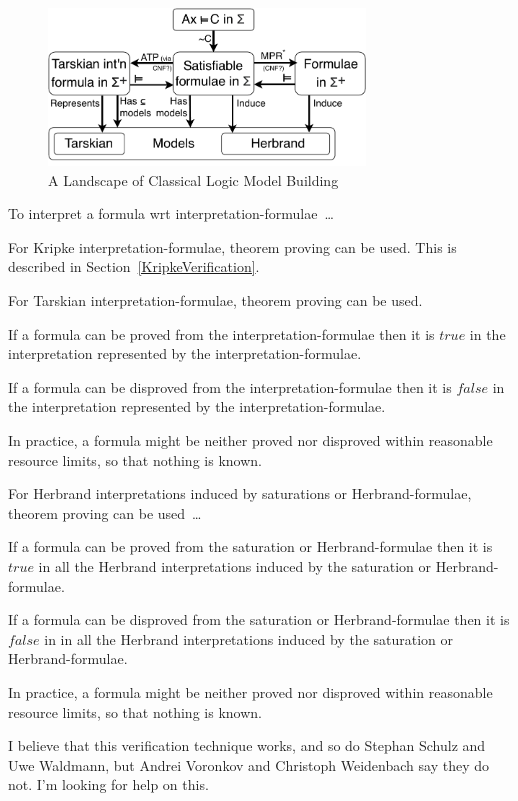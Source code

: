 \documentclass{easychair}
\newenvironment{packed_itemize}{
\vspace*{-0.3em}
\begin{itemize}
\setlength{\partopsep}{0pt}
\setlength{\itemsep}{1pt}
\setlength{\parskip}{0pt}
\setlength{\parsep}{0pt}
}{\end{itemize}}
\begin{document}
\begin{figure}[htbp]
\centering
\includegraphics[width=0.75\textwidth]{ModelLandscape.pdf}
\caption{A Landscape of Classical Logic Model Building}
\label{ModelLandscape}
\end{figure}

To interpret a formula wrt interpretation-formulae~\ldots
\begin{packed_itemize}
\item For Kripke interpretation-formulae, theorem proving can be used.
      This is described in Section~\ref{KripkeVerification}.
\item For Tarskian interpretation-formulae, theorem proving can be used.
      \begin{packed_itemize}
      \item If a formula can be proved from the interpretation-formulae then it is $true$ in the 
            interpretation represented by the interpretation-formulae.
      \item If a formula can be disproved from the interpretation-formulae then it is $false$ in 
            the interpretation represented by the interpretation-formulae.
      \item In practice, a formula might be neither proved nor disproved within reasonable 
            resource limits, so that nothing is known.
      \end{packed_itemize}
\item For Herbrand interpretations induced by saturations or Herbrand-formulae, theorem proving 
      can be used~\ldots
      \begin{packed_itemize}
      \item If a formula can be proved from the saturation or Herbrand-formulae then it is 
            $true$ in all the Herbrand interpretations induced by the saturation or 
            Herbrand-formulae.
      \item If a formula can be disproved from the saturation or Herbrand-formulae then it is 
            $false$ in in all the Herbrand interpretations induced by the saturation or 
            Herbrand-formulae.
      \item In practice, a formula might be neither proved nor disproved within reasonable 
            resource limits, so that nothing is known.
      \end{packed_itemize}
      I believe that this verification technique works, and so do Stephan Schulz and Uwe Waldmann,
      but Andrei Voronkov and Christoph Weidenbach say they do not.
      I'm looking for help on this.
\end{packed_itemize}
\end{document}
